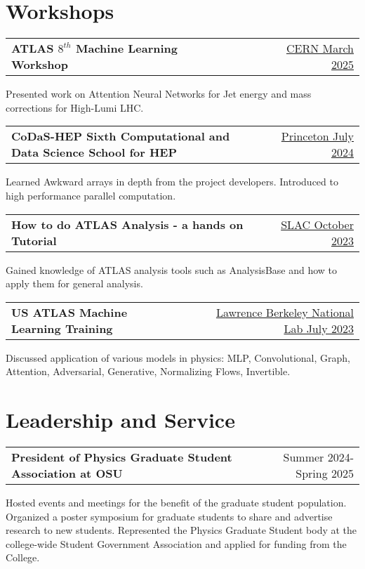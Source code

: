 \documentclass[a4paper,12pt]{article}
\makeatletter
\newenvironment{jobshort}[2]
    {
    \begin{tabularx}{\linewidth}{@{}l X r@{}}
    \textbf{#1} & \hfill &  #2 \\[3.75pt]
    \end{tabularx}
    }
    {
    }
\makeatother
\begin{document}
\section{Workshops}
\begin{jobshort}{ATLAS $8^{th}$ Machine Learning Workshop}{\href{https://indico.cern.ch/event/1488957/}{CERN March 2025}}
Presented work on Attention Neural Networks for Jet energy and mass corrections for High-Lumi LHC.
\end{jobshort}

\begin{jobshort}{CoDaS-HEP Sixth Computational and Data Science School for HEP}{\href{https://indico.cern.ch/event/1422680/}{Princeton July 2024}}
Learned Awkward arrays in depth from the project developers. Introduced to high performance parallel computation.
\end{jobshort}

\begin{jobshort}{How to do ATLAS Analysis - a hands on Tutorial}{\href{https://indico.cern.ch/event/1309794/}{SLAC October 2023}}
Gained knowledge of ATLAS analysis tools such as AnalysisBase and how to apply them for general analysis.
\end{jobshort}

\begin{jobshort}{US ATLAS Machine Learning Training}{\href{https://indico.cern.ch/event/1264566/}{Lawrence Berkeley National Lab July 2023}}
Discussed application of various models in physics: MLP, Convolutional, Graph, Attention, Adversarial, Generative, Normalizing Flows, Invertible.
\end{jobshort}

\section{Leadership and Service}
\begin{jobshort}{President of Physics Graduate Student Association at OSU}{Summer 2024-Spring 2025}
Hosted events and meetings for the benefit of the graduate student population. Organized a poster symposium for graduate students to share and advertise research to new students. Represented the Physics Graduate Student body at the college-wide Student Government Association and applied for funding from the College.
\end{jobshort}
\end{document}
